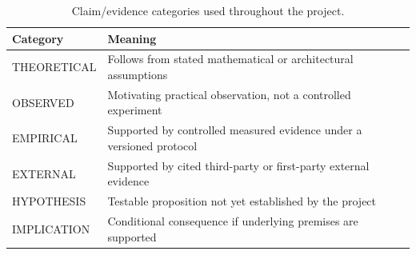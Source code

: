 \begin{table}[htbp]
\centering
\small
\caption{Claim/evidence categories used throughout the project.}
\label{tab:claim-categories}
\begin{tabularx}{\textwidth}{@{}lX@{}}
\toprule
Category & Meaning \\
\midrule
THEORETICAL & Follows from stated mathematical or architectural assumptions \\
OBSERVED & Motivating practical observation, not a controlled experiment \\
EMPIRICAL & Supported by controlled measured evidence under a versioned protocol \\
EXTERNAL & Supported by cited third-party or first-party external evidence \\
HYPOTHESIS & Testable proposition not yet established by the project \\
IMPLICATION & Conditional consequence if underlying premises are supported \\
\bottomrule
\end{tabularx}
\end{table}
